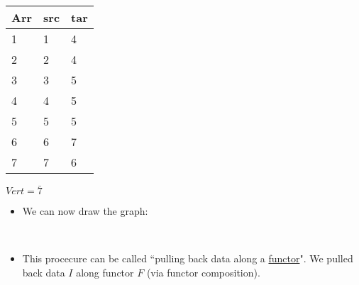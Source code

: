   \begin{minipage}{0.48\textwidth}

    \begin{tabular}{|l|l|l|}
      \hline
      Arr & src & tar \\ \hline
      1   & 1   & 4   \\ \hline
      2   & 2   & 4   \\ \hline
      3   & 3   & 5   \\ \hline
      4   & 4   & 5   \\ \hline
      5   & 5   & 5   \\ \hline
      6   & 6   & 7   \\ \hline
      7   & 7   & 6   \\ \hline
    \end{tabular}
  \end{minipage}
  $Vert = \bar{7}$

  \begin{itemize}
    \item  We can now draw the graph: \,\,
    \item This procecure can be called ``pulling back data along a \href{doc/1 math/Seven Sketches in Compositionality/Chapter 3: Databases/3 Functors, natural transformations, and databases/2 Functors/1 Functor}{functor}". We pulled back data $I$ along functor $F$ (via functor composition).

  \end{itemize}